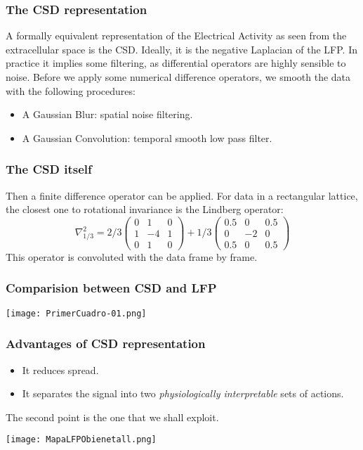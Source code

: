\documentclass[10pt]{beamer}
\begin{document}
\begin{frame}
  \frametitle{The CSD representation}
  A formally equivalent representation of the Electrical Activity
  as seen from the extracellular space is the CSD.
  Ideally, it is the negative Laplacian of the LFP.
  In practice it implies some filtering, as differential operators
  are highly sensible to noise. Before we apply some numerical
  difference operators, we smooth the data with the following procedures:
  \begin{itemize}
  \item A Gaussian Blur: spatial noise filtering.
  \item A Gaussian Convolution: temporal smooth low pass filter. 
  \end{itemize}
\end{frame}

\begin{frame}
  \frametitle{The CSD itself}
  Then a finite difference operator can be applied.
  For data in a rectangular lattice, the closest one
  to rotational invariance is the Lindberg operator:
  \begin{equation}
    \nabla^2_{1/3}=2/3
    \begin{pmatrix}
      0 & 1 & 0 \\
      1 & -4 & 1 \\
      0 & 1 & 0
    \end{pmatrix}
    +1/3
    \begin{pmatrix}
      0.5 & 0 & 0.5 \\
      0 & -2 & 0 \\
      0.5 & 0 & 0.5
    \end{pmatrix}  
\end{equation}
 This operator is convoluted with the data frame by frame. 
\end{frame}

\begin{frame}
  \frametitle{Comparision between CSD and LFP}
  \begin{center}
  \texttt{[image: PrimerCuadro-01.png]}
\end{center}

\end{frame}

\begin{frame}
  \frametitle{Advantages of CSD representation}
  \begin{itemize}
  \item It reduces spread.
  \item It separates the signal into two
    \emph{physiologically interpretable} sets of actions.
  \end{itemize}
  The second point is the one that we shall exploit. 
\begin{center}
  \texttt{[image: MapaLFPObienetall.png]}
\end{center}
\end{frame}
\end{document}

